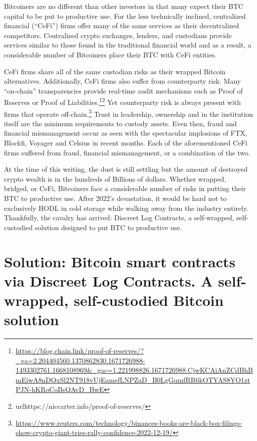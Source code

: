 \documentclass[twoside, a4paper, 11pt]{article}
\begin{document}
  Bitcoiners are no different than other investors in that many expect their BTC capital to be put to productive use. For the less technically inclined, centralized financial (“CeFi”) firms offer many of the same services as their decentralized competitors. Centralized crypto exchanges, lenders, and custodians provide services similar to those found in the traditional financial world and as a result, a considerable number of Bitcoiners place their BTC with CeFi entities.

  CeFi firms share all of the same custodian risks as their wrapped Bitcoin alternatives. Additionally, CeFi firms also suffer from counterparty risk. Many “on-chain” transparencies provide real-time audit mechanisms such as Proof of Reserves or Proof of Liabilities.\footnote{\url{https://blog.chain.link/proof-of-reserves/?_ga=2.204404560.1370862830.1671726988-1493302761.1668108969&_gac=1.221998826.1671726988.CjwKCAiAnZCdBhBmEiwA8nDQxSl2NT918vUjEamefLNPZaD_B0LgGumfRR6kOTYAS8YO1ztPJN-hKRoCoBsQAvD_BwE}}\footnote{url{https://niccarter.info/proof-of-reserves/}} Yet counterparty risk is always present with firms that operate off-chain.\footnote{\url{https://www.reuters.com/technology/binances-books-are-black-box-filings-show-crypto-giant-tries-rally-confidence-2022-12-19/}} Trust in leadership, ownership and in the institution itself are the minimum requirements to custody assets. Even then, fraud and financial mismanagement occur as seen with the spectacular implosions of FTX, Blockfi, Voyager and Celsius in recent months. Each of the aforementioned CeFi firms suffered from fraud, financial mismanagement, or a combination of the two.

  At the time of this writing, the dust is still settling but the amount of destroyed crypto wealth is in the hundreds of Billions of dollars. Whether wrapped, bridged, or CeFi, Bitcoiners face a considerable number of risks in putting their BTC to productive use. After 2022’s devastation, it would be hard not to exclusively HODL in cold storage while walking away from the industry entirely. Thankfully, the cavalry has arrived: Discreet Log Contracts, a self-wrapped, self-custodied solution designed to put BTC to productive use.

  \section{Solution: Bitcoin smart contracts via Discreet Log Contracts. A self-wrapped, self-custodied Bitcoin solution}
\end{document}
